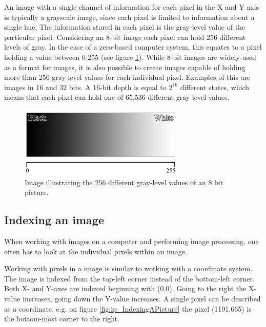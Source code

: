 An image with a single channel of information for each pixel in the X and Y axis is typically a grayscale image, since each pixel is limited to information about a single hue. The information stored in each pixel is the gray-level value of the particular pixel. Considering an 8-bit image each pixel can hold 256 different levels of gray. In the case of a zero-based computer system, this equates to a pixel holding a value between 0-255 (see figure \ref{fig:ip_grayscale}). While 8-bit images are widely-used as a format for images, it is also possible to create images capable of holding more than 256 gray-level values for each individual pixel. Examples of this are images in 16 and 32 bits. A 16-bit depth is equal to $2^{16}$ different states, which means that each pixel can hold one of 65,536 different gray-level values.

\begin{figure}[htbp]
\centering
\includegraphics[width=0.7\textwidth]{Pictures/Theory/Grayscale.jpg}
\caption{Image illustrating the 256 different gray-level values of an 8 bit picture.}
\label{fig:ip_grayscale}
\end{figure}
 
\subsection{Indexing an image}
When working with images on a computer and performing image processing, one often has to look at the individual pixels within an image.

Working with pixels in a image is similar to working with a coordinate system. The image is indexed from the top-left corner instead of the bottom-left corner. Both X- and Y-axes are indexed beginning with (0,0). Going to the right the X-value increases, going down the Y-value increases. A single pixel can be described as a coordinate, e.g. on figure \ref{fig:ip_IndexingAPicture} the pixel (1191,665) is the bottom-most corner to the right.


